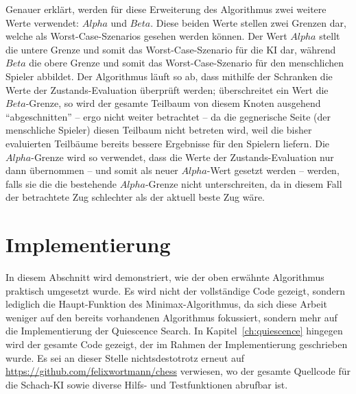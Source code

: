Genauer erklärt, werden für diese Erweiterung des Algorithmus zwei weitere Werte verwendet: $Alpha$ und $Beta$. Diese beiden Werte stellen zwei Grenzen dar, welche als Worst-Case-Szenarios gesehen werden können. Der Wert $Alpha$ stellt die untere Grenze und somit das Worst-Case-Szenario für die KI dar, während $Beta$ die obere Grenze und somit das Worst-Case-Szenario für den menschlichen Spieler abbildet. Der Algorithmus läuft so ab, dass mithilfe der Schranken die Werte der Zustands-Evaluation überprüft werden; überschreitet ein Wert die $Beta$-Grenze, so wird der gesamte Teilbaum von diesem Knoten ausgehend "`abgeschnitten"' -- ergo nicht weiter betrachtet -- da die gegnerische Seite (der menschliche Spieler) diesen Teilbaum nicht betreten wird, weil die bisher evaluierten Teilbäume bereits bessere Ergebnisse für den Spielern liefern. Die $Alpha$-Grenze wird so verwendet, dass die Werte der Zustands-Evaluation nur dann übernommen -- und somit als neuer $Alpha$-Wert gesetzt werden -- werden, falls sie die die bestehende $Alpha$-Grenze nicht unterschreiten, da in diesem Fall der betrachtete Zug schlechter als der aktuell beste Zug wäre.

\section{Implementierung}
In diesem Abschnitt wird demonstriert, wie der oben erwähnte Algorithmus praktisch umgesetzt wurde. Es wird nicht der vollständige Code gezeigt, sondern lediglich die Haupt-Funktion des Minimax-Algorithmus, da sich diese Arbeit weniger auf den bereits vorhandenen Algorithmus fokussiert, sondern mehr auf die Implementierung der Quiescence Search. In Kapitel~\ref{ch:quiescence} hingegen wird der gesamte Code gezeigt, der im Rahmen der Implementierung geschrieben wurde. Es sei an dieser Stelle nichtsdestotrotz erneut auf \url{https://github.com/felixwortmann/chess} verwiesen, wo der gesamte Quellcode für die Schach-KI sowie diverse Hilfs- und Testfunktionen abrufbar ist.

